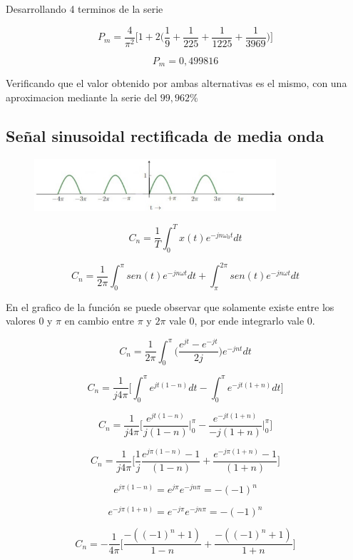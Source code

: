 Desarrollando 4 terminos de la serie

\[P_m = \dfrac{4}{\pi^2} \bigg[1 + 2 \bigg(\dfrac{1}{9} + \dfrac{1}{225} + \dfrac{1}{1225} + \dfrac{1}{3969} \bigg) \bigg] \]

$$P_m = 0,499816 $$

Verificando que el valor obtenido por ambas alternativas es el mismo, con una aproximacion mediante la serie del $99,962\percent$

\subsection{Se\~nal sinusoidal rectificada de media onda}

\begin{figure}[H]
  \centering
  \includegraphics[width=0.8\textwidth]{photos/onda_media.png}
\end{figure}

$$C_n = \dfrac{1}{T} \int_{0}^{T} x(t) e^{-jn\omega_0t} dt$$

$$C_n = \dfrac{1}{2\pi} \int_{0}^{\pi} sen(t) e^{-jn\omega t} dt + \int_{\pi}^{2\pi} sen(t) e^{-jn\omega t} dt $$

En el grafico de la funci\'on se puede observar que solamente existe entre los valores $0$ y $\pi$ en cambio entre $\pi$ y $2\pi$ vale 0, por ende integrarlo vale 0.

$$C_n = \dfrac{1}{2\pi} \int_{0}^{\pi} \bigg(\dfrac{e^{jt} - e^{-jt}}{2j} \bigg) e^{-jnt} dt $$

$$C_n = \dfrac{1}{j4\pi} \bigg[\int_{0}^{\pi} e^{jt(1-n)} dt - \int_{0}^{\pi} e^{-jt(1+n)} dt \bigg] $$

$$C_n = \dfrac{1}{j4\pi} \bigg[\dfrac{e^{jt(1-n)}}{j(1-n)} \bigg\rvert_{0}^{\pi} - \dfrac{e^{-jt(1+n)}}{-j(1+n)} \bigg\rvert_{0}^{\pi} \bigg] $$

$$C_n = \dfrac{1}{j4\pi} \bigg[\dfrac{1}{j} \dfrac{e^{j\pi(1-n)}-1}{(1-n)} + \dfrac{e^{-j\pi(1+n)}-1}{(1+n  )} \bigg] $$

$$e^{j\pi(1-n)} = e^{j\pi} e^{-jn\pi} = -(-1)^n $$

$$e^{-j\pi(1+n)} = e^{-j\pi} e^{-jn\pi} = -(-1)^n $$

$$C_n = -\dfrac{1}{4\pi} \bigg[\dfrac{-((-1)^n + 1)}{1-n} + \dfrac{-((-1)^n + 1)}{1+n} \bigg] $$

